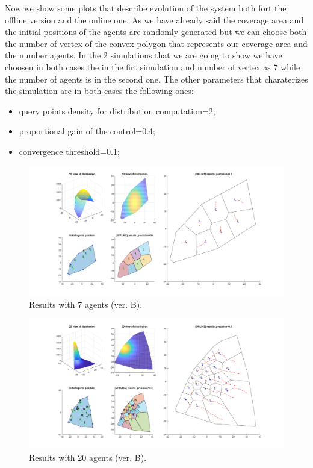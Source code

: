 \documentclass[a4paper,11pt,oneside]{book}
\begin{document}
	Now we show some plots that describe evolution of the system both fort the offline version and the online one. As we have already said the coverage area and the initial positions of the agents are randomly generated but we can choose both the number of vertex of the convex polygon that represents our coverage area and the number agents. In the 2 simulations that we are going to show we have choosen in both cases the  in the firt simulation and number of vertex as 7 while the number of agents is in the second one.
	The other parameters that charaterizes the simulation are in both cases the following ones:
	
	\begin{itemize}
		\item query points density for distribution computation=2;
		\item proportional gain of the control=0.4;
		\item convergence threshold=0.1;

	\end{itemize}
	
	\begin{figure}	[H]
		\centering	
		\includegraphics[scale=0.45,angle=90]{figs/convergenceResultsB.png}
		\caption{Results with 7 agents (ver. B).}\label{fig:convergenceResultsB.png}	
	\end{figure}
	
	\begin{figure}[H]
		\centering	
		\includegraphics[scale=0.45, angle=90]{figs/20convergenceResultsB.png}
		\caption{Results with 20 agents (ver. B).}\label{fig:20convergenceResultsB.png}	
	\end{figure}
	
\end{document}
